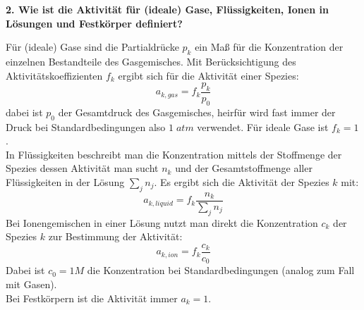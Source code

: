 \noindent \textbf{2. Wie ist die Aktivität für (ideale) Gase, Flüssigkeiten, Ionen in Lösungen und Festkörper definiert?}\\
\begin{addmargin}[25pt]{0pt}
Für (ideale) Gase sind die Partialdrücke $p_k$ ein Maß für die Konzentration der einzelnen Bestandteile des Gasgemisches. Mit Berücksichtigung des Aktivitätskoeffizienten $f_k$ ergibt sich für die Aktivität einer Spezies: 
\begin{equation}\label{eq:activity_gas}
    a_{k,gas} = f_k \frac{p_k}{p_0}
\end{equation}
dabei ist $p_0$ der Gesamtdruck des Gasgemisches, heirfür wird fast immer der Druck bei Standardbedingungen also $1\; \si{atm} $ verwendet. Für ideale Gase ist $f_k = 1$.\\
In Flüssigkeiten beschreibt man die Konzentration mittels der Stoffmenge der Spezies dessen Aktivität man sucht $n_k$ und der Gesamtstoffmenge aller Flüssigkeiten in der Lösung $\sum\limits_j n_j$. Es ergibt sich die Aktivität der Spezies $k$ mit:
\begin{equation}\label{eq:activity_liquid}
    a_{k,liquid} = f_k \frac{n_k}{\sum\limits_j n_j}
\end{equation}
Bei Ionengemischen in einer Lösung nutzt man direkt die Konzentration $c_k$ der Spezies $k$ zur Bestimmung der Aktivität:
\begin{equation}\label{eq:activity_ions}
    a_{k,ion} = f_k\frac{c_k}{c_0}
\end{equation}
Dabei ist $c_0 = 1\si{M}$ die Konzentration bei Standardbedingungen (analog zum Fall mit Gasen).\\
Bei Festkörpern ist die Aktivität immer $a_k = 1$.\\
\end{addmargin}


